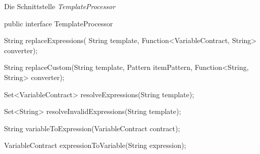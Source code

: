 \begin{program}[h]
\caption{Die Schnittstelle \emph{TemplateProcessor}}
\label{prog:templateProcessor}
\begin{JavaCode}
public interface TemplateProcessor {

    String replaceExpressions(
                      String template,
                      Function<VariableContract, String> converter);

    String replaceCustom(String template,
                         Pattern itemPattern,
                         Function<String, String> converter);

    Set<VariableContract> resolveExpressions(String template);

    Set<String> resolveInvalidExpressions(String template);

    String variableToExpression(VariableContract contract);

    VariableContract expressionToVariable(String expression);
    
}
\end{JavaCode}
\end{program}

